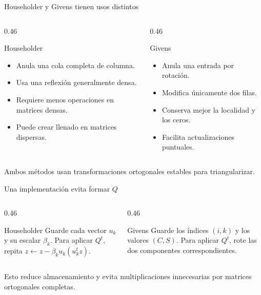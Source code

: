 \documentclass[aspectratio=169,12pt]{beamer}
\begin{document}
\begin{frame}{Householder y Givens tienen usos distintos}
\begin{columns}[T,onlytextwidth]
\begin{column}{0.46\textwidth}
\begin{block}{Householder}
\begin{itemize}
  \item Anula una cola completa de columna.
  \item Usa una reflexión generalmente densa.
  \item Requiere menos operaciones en matrices densas.
  \item Puede crear llenado en matrices dispersas.
\end{itemize}
\end{block}
\end{column}
\begin{column}{0.46\textwidth}
\begin{block}{Givens}
\begin{itemize}
  \item Anula una entrada por rotación.
  \item Modifica únicamente dos filas.
  \item Conserva mejor la localidad y los ceros.
  \item Facilita actualizaciones puntuales.
\end{itemize}
\end{block}
\end{column}
\end{columns}
\vspace{0.3cm}
Ambos métodos usan transformaciones ortogonales estables para triangularizar.
\end{frame}

\begin{frame}{Una implementación evita formar $Q$}
\begin{columns}[T,onlytextwidth]
\begin{column}{0.46\textwidth}
\begin{block}{Householder}
Guarde cada vector $u_k$ y su escalar $\beta_k$. Para aplicar $Q^t$, repita
$z\leftarrow z-\beta_ku_k(u_k^tz)$.
\end{block}
\end{column}
\begin{column}{0.46\textwidth}
\begin{block}{Givens}
Guarde los índices $(i,k)$ y los valores $(C,S)$. Para aplicar $Q^t$, rote las
dos componentes correspondientes.
\end{block}
\end{column}
\end{columns}
\vspace{0.4cm}
Esto reduce almacenamiento y evita multiplicaciones innecesarias por matrices
ortogonales completas.
\end{frame}
\end{document}
